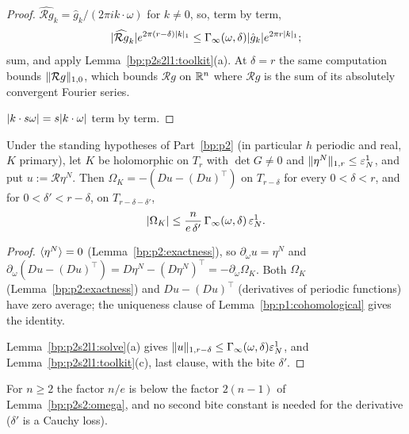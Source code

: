 \begin{proof}
\label{step:p2s2l1:so-coef}
$\widehat{\mathcal Rg}_k=\hat g_k/(2\pi ik\cdot\omega)$ for $k\ne0$, so, term by term,
\[
\lvert \widehat{\mathcal Rg}_k\rvert e^{2\pi(r-\delta)\lvert k\rvert_1}\le\Gamma_\infty(\omega,\delta)\lvert \hat g_k\rvert e^{2\pi r\lvert k\rvert_1};
\]
sum, and apply Lemma~\ref{bp:p2s2l1:toolkit}(a). At $\delta=r$ the same computation bounds $\lVert \mathcal Rg\rVert_{1,0}$, which bounds
$\mathcal Rg$ on $\mathbb{R}^n$ where $\mathcal Rg$ is the sum of its absolutely convergent Fourier series.

\label{step:p2s2l1:so-ray}
$\lvert k\cdot s\omega\rvert=s\lvert k\cdot\omega\rvert$ term by term.
\end{proof}

\begin{lemma}[The Lagrangian defect from $u=\mathcal R\eta^N$]\label{bp:p2s2l1:defect}
Under the standing hypotheses of Part~\ref{bp:p2} (in particular $h$ periodic and real, $K$ primary), let $K$ be holomorphic on $T_r$ with
$\det G\ne0$ and $\lVert \eta^N\rVert_{1,r}\le\varepsilon^1_N$, and put $u:=\mathcal R\eta^N$. Then $\Omega_K=-(Du-(Du)^\top)$ on $T_{r-\delta}$ for every
$0<\delta<r$, and for $0<\delta'<r-\delta$, on $T_{r-\delta-\delta'}$,
\[
\lvert \Omega_K\rvert\le\frac{n}{e\,\delta'}\,\Gamma_\infty(\omega,\delta)\,\varepsilon^1_N .
\]
\end{lemma}

\begin{proof}
\label{step:p2s2l1:de-id}
$\langle \eta^N\rangle=0$ (Lemma~\ref{bp:p2:exactness}), so $\partial_\omega u=\eta^N$ and $\partial_\omega(Du-(Du)^\top)=D\eta^N-(D\eta^N)^\top=-\partial_\omega\Omega_K$. Both
$\Omega_K$ (Lemma~\ref{bp:p2:exactness}) and $Du-(Du)^\top$ (derivatives of periodic functions) have zero average; the uniqueness clause of
Lemma~\ref{bp:p1:cohomological} gives the identity.

\label{step:p2s2l1:de-b}
Lemma~\ref{bp:p2s2l1:solve}(a) gives $\lVert u\rVert_{1,r-\delta}\le\Gamma_\infty(\omega,\delta)\varepsilon^1_N$, and Lemma~\ref{bp:p2s2l1:toolkit}(c), last clause, with
the bite $\delta'$.
\end{proof}

For $n\ge2$ the factor $n/e$ is below the factor $2(n-1)$ of Lemma~\ref{bp:p2s2:omega}, and no second bite constant is needed for the
derivative ($\delta'$ is a Cauchy loss).

